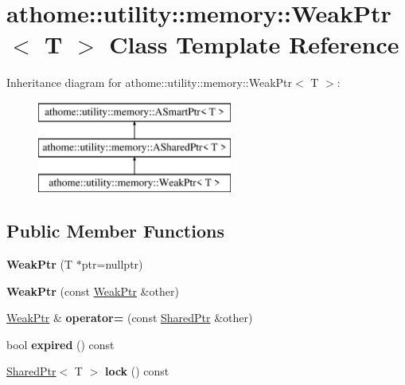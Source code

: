 \hypertarget{classathome_1_1utility_1_1memory_1_1_weak_ptr}{}\section{athome\+:\+:utility\+:\+:memory\+:\+:Weak\+Ptr$<$ T $>$ Class Template Reference}
\label{classathome_1_1utility_1_1memory_1_1_weak_ptr}
Inheritance diagram for athome\+:\+:utility\+:\+:memory\+:\+:Weak\+Ptr$<$ T $>$\+:\begin{figure}[H]
\begin{center}
\leavevmode
\includegraphics[height=3.000000cm]{classathome_1_1utility_1_1memory_1_1_weak_ptr}
\end{center}
\end{figure}
\subsection*{Public Member Functions}
\begin{DoxyCompactItemize}
\item 
\mbox{\label{classathome_1_1utility_1_1memory_1_1_weak_ptr_af2fb6acc57fdc47ee3385781788f5458}} 
{\bfseries Weak\+Ptr} (T $\ast$ptr=nullptr)
\item 
\mbox{\label{classathome_1_1utility_1_1memory_1_1_weak_ptr_a25703c08b7d7fd98c99a2d1db39a632d}} 
{\bfseries Weak\+Ptr} (const \mbox{\hyperlink{classathome_1_1utility_1_1memory_1_1_weak_ptr}{Weak\+Ptr}} \&other)
\item 
\mbox{\label{classathome_1_1utility_1_1memory_1_1_weak_ptr_abaee6af5db5fccc03bf57a3d2011fe49}} 
\mbox{\hyperlink{classathome_1_1utility_1_1memory_1_1_weak_ptr}{Weak\+Ptr}} \& {\bfseries operator=} (const \mbox{\hyperlink{classathome_1_1utility_1_1memory_1_1_shared_ptr}{Shared\+Ptr}} \&other)
\item 
\mbox{\label{classathome_1_1utility_1_1memory_1_1_weak_ptr_adb501f73a2b8c33c424b9a2fa6e8fd0f}} 
bool {\bfseries expired} () const
\item 
\mbox{\label{classathome_1_1utility_1_1memory_1_1_weak_ptr_ac64116c16acd3ba56cf02193ab331e7e}} 
\mbox{\hyperlink{classathome_1_1utility_1_1memory_1_1_shared_ptr}{Shared\+Ptr}}$<$ T $>$ {\bfseries lock} () const
\end{DoxyCompactItemize}
